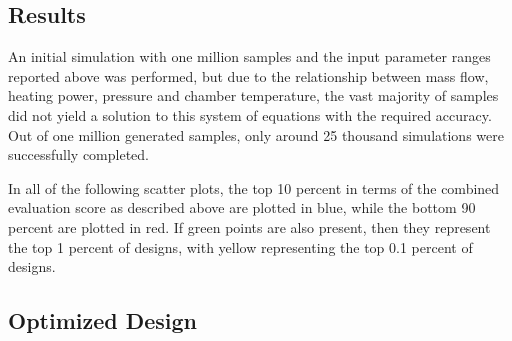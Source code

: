 \documentclass{homework}
\begin{document}
\begin{multicols}{2}
\section{Results}

An initial simulation with one million samples and the input parameter ranges reported above was performed, but due to the relationship between mass flow, heating power, pressure and chamber temperature, the vast majority of samples did not yield a solution to this system of equations with the required accuracy. Out of one million generated samples, only around 25 thousand simulations were successfully completed.
  
  In all of the following scatter plots, the top 10 percent in terms of the combined evaluation score as described above are plotted in blue, while the bottom 90 percent are plotted in red. If green points are also present, then they represent the top 1 percent of designs, with yellow representing the top 0.1 percent of designs.

\subsection{Optimized Design}
  

\end{multicols}
\end{document}

